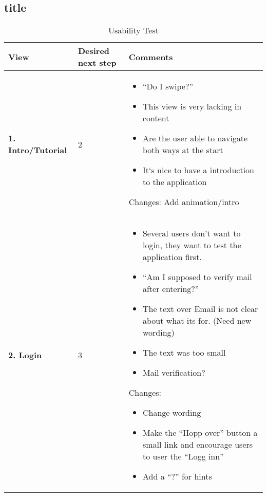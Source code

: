 			\subsection{title}
			\renewcommand{\arraystretch}{2}%
			\begin{center}
				\begin{longtable}{ | p{4cm} | p{3cm} | p{9cm}|}
					
					\caption[Usability test]{Usability Test } \label{Tab:usabilityTest}\\
					\hline
					\textbf{View} & \textbf{Desired next step} & \textbf{Comments}
					\\ \hline
					
					\textbf{1. Intro/Tutorial} & 2 & 
					\begin{itemize}
						\item “Do  I swipe?”
						\item This view is very lacking in content
						\item Are the user able to navigate both ways at the start
						\item It`s nice to have a introduction to the application
					\end{itemize}
					Changes:
					Add animation/intro
					\\\hline
					
					\textbf{2. Login} & 3  & 
					\begin{itemize}
						\item Several users don’t want to login, they want to test the application first.
						\item “Am I supposed to verify mail after entering?”
						\item	The text over Email is not clear about  what its for. (Need new wording)
						\item The text was too small
						\item Mail verification?
					\end{itemize}
					Changes:
					\begin{itemize}
						\item Change wording
						\item Make the “Hopp over” button a small link and encourage users to user the “Logg inn”
						\item  Add a “?” for hints
					\end{itemize}
					\\\hline
					

\end{longtable}
\end{center}
